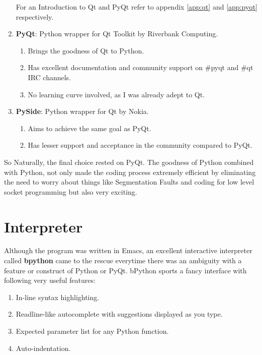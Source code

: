 \begin{enumerate}
For an Introduction to Qt and PyQt refer to appendix \ref{app:qt} and \ref{app:pyqt} respectively.
\item \textbf{PyQt}: Python wrapper for Qt Toolkit by Riverbank Computing.
  \begin{enumerate}
  \item Brings the goodness of Qt to Python. 
  \item Has excellent documentation and community support on \#pyqt and \#qt IRC channels.
  \item No learning curve involved, as I was already adept to Qt.
  \end{enumerate}
\item \textbf{PySide}: Python wrapper for Qt by Nokia.
  \begin{enumerate}
  \item Aims to achieve the same goal as PyQt.
  \item Has lesser support and acceptance in the community compared to PyQt.
  \end{enumerate}
\end{enumerate}
So Naturally, the final choice rested on PyQt. The goodness of Python combined with Python, not only made the coding process extremely efficient by eliminating the need to worry about things like Segmentation Faults and coding for low level socket programming but also very exciting.

\section{Interpreter}
Although the program was written in Emacs, an excellent interactive interpreter called \textbf{bpython} came to the rescue everytime there was an ambiguity with a feature or construct of Python or PyQt. bPython sports a fancy interface with following very useful features:
\begin{enumerate}
\item In-line syntax highlighting.
\item Readline-like autocomplete with suggestions displayed as you type.
\item Expected parameter list for any Python function.
\item Auto-indentation.
\end{enumerate}

